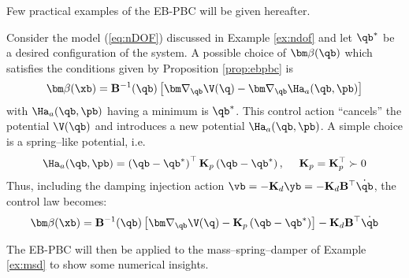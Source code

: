 %
Few practical examples of the EB-PBC will be given hereafter.
%
\begin{exmp}
    Consider the model (\ref{eq:nDOF}) discussed in Example \ref{ex:ndof} and let $\qb^*$ be a desired configuration of the system. A possible choice of $\bm\beta(\qb)$ which satisfies the conditions given by Proposition \ref{prop:ebpbc} is
    \begin{equation}
        \bm\beta(\xb) = \mathbf{B}^{-1}(\qb)\left[\bm\nabla_{\qb}\V(\q) - \bm\nabla_\qb\Ha_a(\qb,\pb)\right]
    \end{equation}
    with $\Ha_a(\qb,\pb)$ having a minimum is $\qb^*$. This control action ``cancels'' the potential $\V(\qb)$ and introduces a new potential $\Ha_a(\qb,\pb)$. A simple choice is a spring--like potential, i.e.
    \begin{equation}
        \Ha_a(\qb,\pb) = \left(\qb-\qb^*\right)^\top\mathbf{K}_p\left(\qb-\qb^*\right),~~~~\mathbf{K}_p = \mathbf{K}_p^\top\succ 0
    \end{equation}
    Thus, including the damping injection action $\vb = -\mathbf{K}_d\yb =-\mathbf{K}_d\mathbf{B}^\top\dot{\qb}$, the control law becomes:
    \begin{equation}
        \bm\beta(\xb) = \mathbf{B}^{-1}(\qb)\left[\bm\nabla_{\qb}\V(\q) - \mathbf{K}_p\left(\qb-\qb^*\right)\right] - \mathbf{K}_d\mathbf{B}^\top\dot{\qb}
    \end{equation}
\end{exmp}
%
The EB-PBC will then be applied to the mass--spring--damper of Example \ref{ex:msd} to show some numerical insights. 
%
